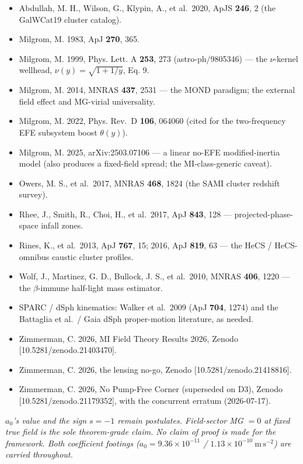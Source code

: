 \documentclass[
]{article}
\providecommand{\tightlist}{%
  \setlength{\itemsep}{0pt}\setlength{\parskip}{0pt}}
\begin{document}
\begin{itemize}
\tightlist
\item
  Abdullah, M. H., Wilson, G., Klypin, A., et al.~2020, ApJS
  \textbf{246}, 2 (the GalWCat19 cluster catalog).
\item
  Milgrom, M. 1983, ApJ \textbf{270}, 365.
\item
  Milgrom, M. 1999, Phys. Lett. A \textbf{253}, 273 (astro-ph/9805346)
  --- the \(\nu\)-kernel wellhead, \(\nu(y)=\sqrt{1+1/y}\), Eq. 9.
\item
  Milgrom, M. 2014, MNRAS \textbf{437}, 2531 --- the MOND paradigm; the
  external field effect and MG-virial universality.
\item
  Milgrom, M. 2022, Phys. Rev.~D \textbf{106}, 064060 (cited for the
  two-frequency EFE subsystem boost \(\theta(y)\)).
\item
  Milgrom, M. 2025, arXiv:2503.07106 --- a linear no-EFE
  modified-inertia model (also produces a fixed-field spread; the
  MI-class-generic caveat).
\item
  Owers, M. S., et al.~2017, MNRAS \textbf{468}, 1824 (the SAMI cluster
  redshift survey).
\item
  Rhee, J., Smith, R., Choi, H., et al.~2017, ApJ \textbf{843}, 128 ---
  projected-phase-space infall zones.
\item
  Rines, K., et al.~2013, ApJ \textbf{767}, 15; 2016, ApJ \textbf{819},
  63 --- the HeCS / HeCS-omnibus caustic cluster profiles.
\item
  Wolf, J., Martinez, G. D., Bullock, J. S., et al.~2010, MNRAS
  \textbf{406}, 1220 --- the \(\beta\)-immune half-light mass estimator.
\item
  SPARC / dSph kinematics: Walker et al.~2009 (ApJ \textbf{704}, 1274)
  and the Battaglia et al.~/ Gaia dSph proper-motion literature, as
  needed.
\item
  Zimmerman, C. 2026, MI Field Theory Results 2026, Zenodo
  {[}10.5281/zenodo.21403470{]}.
\item
  Zimmerman, C. 2026, the lensing no-go, Zenodo
  {[}10.5281/zenodo.21418816{]}.
\item
  Zimmerman, C. 2026, No Pump-Free Corner (superseded on D3), Zenodo
  {[}10.5281/zenodo.21179352{]}, with the concurrent erratum
  (2026-07-17).
\end{itemize}

\emph{\(a_0\)'s value and the sign \(s=-1\) remain postulates.
Field-sector MG \(=0\) at fixed true field is the sole theorem-grade
claim. No claim of proof is made for the framework. Both coefficient
footings (\(a_0=9.36\times10^{-11}\) /
\(1.13\times10^{-10}\ \mathrm{m\,s^{-2}}\)) are carried throughout.}
\end{document}
